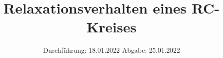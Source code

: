 

\subject{V353}
\title{Relaxationsverhalten eines RC-Kreises}
\date{%
  Durchführung: 18.01.2022
  \hspace{3em}
  Abgabe: 25.01.2022
}



\maketitle
\thispagestyle{empty}
\tableofcontents
\newpage






\printbibliography{}


